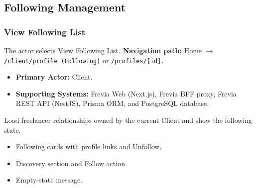 

\subsection{Following Management}

\subsubsection{View Following List}

The actor selects View Following List.\newline
\textbf{Navigation path:} Home $\rightarrow$ \texttt{/\allowbreak{}client/\allowbreak{}profile (Following)} or \texttt{/\allowbreak{}profiles/\allowbreak{}[id].}


\begin{itemize}[leftmargin=1.6em,topsep=3pt,itemsep=2pt,parsep=0pt,label=$\bullet$]
    \item \textbf{Primary Actor:} Client.
    \item \textbf{Supporting Systems:} Frevia Web (Next.js), Frevia BFF proxy, Frevia REST API (NestJS), Prisma ORM, and PostgreSQL database.
\end{itemize}

\noindent Load freelancer relationships owned by the current Client and show the following state.

\begin{itemize}[leftmargin=1.6em,topsep=3pt,itemsep=2pt,parsep=0pt,label=$\bullet$]
    \item Following cards with profile links and Unfollow.
    \item Discovery section and Follow action.
    \item Empty-state message.
\end{itemize}

